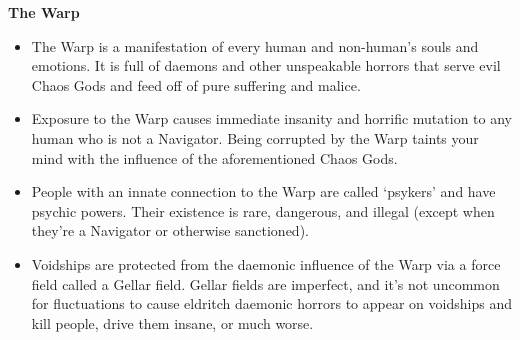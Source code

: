 \documentclass[10pt,a4paper]{article}
\newcommand{\rpgsection}[1]{%
  \vspace{0.8em}%
  {\headerfont\bfseries\Large #1}\par%
  \vspace{0.5em}%
}
\begin{document}
\begin{multicols}{2}
\rpgsection{The Warp}
\begin{itemize}
  \item The Warp is a manifestation of every human and non-human’s souls and emotions. It is full of daemons and other unspeakable horrors that serve evil Chaos Gods and feed off of pure suffering and malice.
  \item Exposure to the Warp causes immediate insanity and horrific mutation to any human who is not a Navigator. Being corrupted by the Warp taints your mind with the influence of the aforementioned Chaos Gods.
  \item People with an innate connection to the Warp are called ‘psykers’ and have psychic powers. Their existence is rare, dangerous, and illegal (except when they’re a Navigator or otherwise sanctioned).
  \item Voidships are protected from the daemonic influence of the Warp via a force field called a Gellar field. Gellar fields are imperfect, and it’s not uncommon for fluctuations to cause eldritch daemonic horrors to appear on voidships and kill people, drive them insane, or much worse.
\end{itemize}


\end{multicols}
\end{document}
